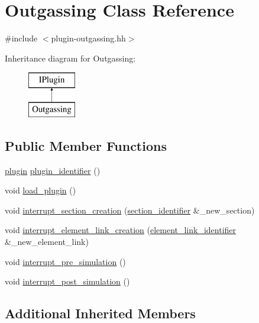 \hypertarget{classOutgassing}{\section{Outgassing Class Reference}
\label{classOutgassing}
}


{\ttfamily \#include $<$plugin-\/outgassing.\-hh$>$}

Inheritance diagram for Outgassing\-:\begin{figure}[H]
\begin{center}
\leavevmode
\includegraphics[height=2.000000cm]{classOutgassing}
\end{center}
\end{figure}
\subsection*{Public Member Functions}
\begin{DoxyCompactItemize}
\item 
\hyperlink{plugins_8hh_af34747f68f9b0963dea6e8f3c659659c}{plugin} \hyperlink{classOutgassing_a35c522220af5add597f30bcf2a07df68}{plugin\-\_\-identifier} ()
\item 
void \hyperlink{classOutgassing_aa999ed92df7cc8858da8f877db1c6bf3}{load\-\_\-plugin} ()
\item 
void \hyperlink{classOutgassing_a5a1afcb787654cb41df8ee91f88dee21}{interrupt\-\_\-section\-\_\-creation} (\hyperlink{structsection__identifier}{section\-\_\-identifier} \&\-\_\-new\-\_\-section)
\item 
void \hyperlink{classOutgassing_a71237bfa8220b867ba35a360fd5f869f}{interrupt\-\_\-element\-\_\-link\-\_\-creation} (\hyperlink{structelement__link__identifier}{element\-\_\-link\-\_\-identifier} \&\-\_\-new\-\_\-element\-\_\-link)
\item 
void \hyperlink{classOutgassing_a7c51e9f9622f1533904efc719b353f55}{interrupt\-\_\-pre\-\_\-simulation} ()
\item 
void \hyperlink{classOutgassing_a1c3cb8741c2cdc09e807db1d77a3808a}{interrupt\-\_\-post\-\_\-simulation} ()
\end{DoxyCompactItemize}
\subsection*{Additional Inherited Members}


